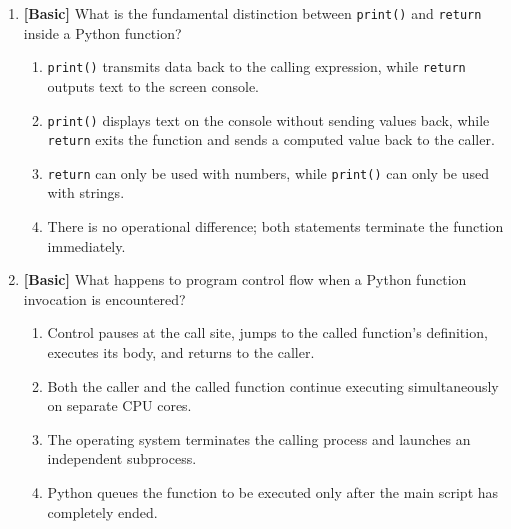 \documentclass[11pt,a4paper]{article}
\begin{document}
\begin{enumerate}[label=\textbf{Q\arabic*.},leftmargin=1.8em,itemsep=0.8pt,topsep=0.3pt,resume]
\item \textbf{[Basic]} What is the fundamental distinction between \texttt{print()} and \texttt{return} inside a Python function?
\begin{enumerate}[label=\Alph*.,leftmargin=1.8em]
  \item \texttt{print()} transmits data back to the calling expression, while \texttt{return} outputs text to the screen console.
  \item \texttt{print()} displays text on the console without sending values back, while \texttt{return} exits the function and sends a computed value back to the caller.
  \item \texttt{return} can only be used with numbers, while \texttt{print()} can only be used with strings.
  \item There is no operational difference; both statements terminate the function immediately.
\end{enumerate}

\item \textbf{[Basic]} What happens to program control flow when a Python function invocation is encountered?
\begin{enumerate}[label=\Alph*.,leftmargin=1.8em]
  \item Control pauses at the call site, jumps to the called function's definition, executes its body, and returns to the caller.
  \item Both the caller and the called function continue executing simultaneously on separate CPU cores.
  \item The operating system terminates the calling process and launches an independent subprocess.
  \item Python queues the function to be executed only after the main script has completely ended.
\end{enumerate}

\end{enumerate}

\newpage

\end{document}
